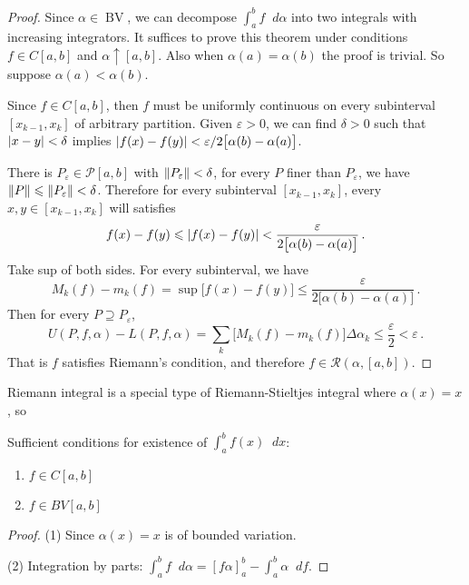 \documentclass{article}
\newcommand{\Riemann}{\mathcal R}
\newcommand{\Partition}{\mathcal P}
\DeclarePairedDelimiter\abs{\lvert}{\rvert}
\DeclarePairedDelimiter\norm{\lVert}{\rVert}
\newcommand{\finer}{\supseteq}
\newcommand{\dd}{\mathop{}\!d}
\newcommand{\increasing}{\uparrow}
\DeclareMathOperator{\BV}{BV}
\begin{document}
\begin{proof}
    Since $ \alpha \in \BV $, we can decompose $ \int_a^b f \dd \alpha $ into two integrals with increasing integrators. It suffices to prove this theorem under conditions $ f \in C[a, b] $ and $ \alpha \increasing [a, b] $. Also when $ \alpha(a) = \alpha(b) $ the proof is trivial. So suppose $ \alpha(a) < \alpha(b) $.

    Since $ f \in C[a, b] $, then $ f $ must be uniformly continuous on every subinterval $ [x_{k-1}, x_k] $ of arbitrary partition. Given $ \varepsilon > 0 $, we can find $ \delta > 0 $ such that $ \abs{ x - y } < \delta $ implies $ \abs{ f(x) - f(y) } < \varepsilon / 2\big[ \alpha(b) - \alpha(a) \big] $.

    There is $ P_\varepsilon \in \Partition[a, b] $ with $ \norm{P_\varepsilon} < \delta $, for every $ P $ finer than $ P_\varepsilon $, we have $ \norm{P} \leqslant \norm{P_\varepsilon} < \delta $. Therefore for every subinterval $ [x_{k-1}, x_k] $, every $ x, y \in [x_{k-1}, x_k] $ will satisfies
    \[ 
        f(x) - f(y) \leqslant \abs{ f(x) - f(y) } < \dfrac{\varepsilon}{2 \big[ \alpha(b) - \alpha(a) \big]} \,.
    \]
    Take sup of both sides. For every subinterval, we have
    \[ 
        M_k(f) - m_k(f) = \sup \big[ f(x) - f(y) \big] \leqslant \dfrac{\varepsilon}{2 \big[ \alpha(b) - \alpha(a) \big]} \,.
    \]
    Then for every $ P \finer P_\varepsilon $,
    \[ 
        U(P, f, \alpha) - L(P, f, \alpha) = \sum_{k} \big[ M_k(f) - m_k(f) \big] \Delta \alpha_k \leqslant \dfrac{\varepsilon}{2} < \varepsilon \,.
    \]
    That is $ f $ satisfies Riemann's condition, and therefore $ f \in \Riemann(\alpha, [a, b]) $.
\end{proof}

Riemann integral is a special type of Riemann-Stieltjes integral where $ \alpha(x) = x $, so 
\begin{theorem}[Riemann]
    Sufficient conditions for existence of $ \int_a^b f(x) \dd x $:
    \begin{enumerate}
        \item $ f \in C[a, b] $
        \item $ f \in BV[a, b] $
    \end{enumerate}
\end{theorem}

\begin{proof}
    (1) Since $ \alpha(x) = x $ is of bounded variation.

    (2) Integration by parts: $ \int_a^b f \dd \alpha = [f\alpha]_a^b - \int_a^b \alpha \dd f $.
\end{proof}
\end{document}
